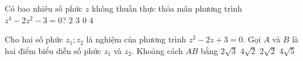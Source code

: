 \begin{ex}%
    Có bao nhiêu số phức $z$ không thuần thực thỏa mãn phương trình $z^4-2z^2-3=0$?
    \choice
    {\True $2$}
    {$3$}
    {$0$}
    {$4$}
\end{ex}

\begin{ex}%
    Cho hai số phức $z_1;z_2$ là nghiệm của phương trình $z^2-2z+3=0$. Gọi $A$ và $B$ là hai điểm biểu diễn số phức $z_1$ và $z_2$. Khoảng cách $AB$ bằng
    \choice
    {$2\sqrt3$}
    {$4\sqrt2$}
    {\True $2\sqrt2$}
    {$4\sqrt5$}
\end{ex}

